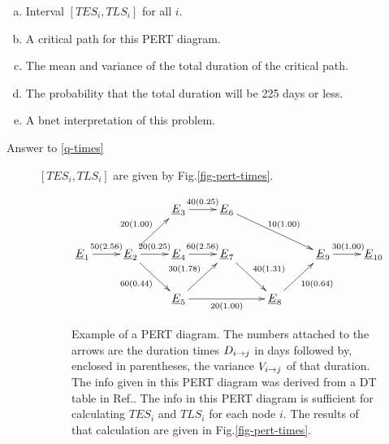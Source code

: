 \begin{enumerate}[(a)]
\item\label{q-times} Interval $[TES_i, TLS_i]$
for all $i$.
\item\label{q-critical}A critical path
for this PERT diagram.
\item\label{q-mean-variance-d} The
mean and variance of the total
duration of the critical path.
\item\label{q-prob} The probability that
the total duration will be 225 days or less.
\item\label{q-pert-bnets} A bnet interpretation
of this problem.
\end{enumerate}
\begin{description}

\item[Answer to \ref{q-times}]
$[TES_i, TLS_i]$
are given by Fig.\ref{fig-pert-times}.

\begin{figure}[h!]
\centering
$$\xymatrix{
&&\rvE_3\ar[r]^{40 (0.25)}
&\rvE_6\ar[drr]^{10 (1.00)}
\\
\rvE_1\ar[r]^{50 (2.56)}
&\rvE_2\ar[ru]^{20 (1.00)}
\ar[rd]_{60 (0.44)}
\ar[r]^{20 (0.25)}
&\rvE_4\ar[r]^{60 (2.56)}
&\rvE_7\ar[rd]^{40 (1.31) }
&&\rvE_9\ar[r]^{30 (1.00)}
&\rvE_{10}
\\
&&\rvE_5\ar[ru]^{30 (1.78)}
\ar[rr]_{20 (1.00)}
&&\rvE_8\ar[ru]_{10 (0.64)}
}$$
\caption{Example of a PERT
diagram. The numbers attached to
the arrows are the duration times
 $D_{i\rightarrow j}$ in days
followed by, enclosed
in parentheses,
the variance $V_{i\rightarrow j}$
of that duration.
The info given
in this PERT diagram
was derived
from a DT table in Ref.\cite{ibook}. The
info in this PERT
diagram 
is sufficient
for calculating
$TES_i$ and $TLS_i$
for each node $i$.
The results of that calculation 
are given in Fig.\ref{fig-pert-times}.
}
\label{fig-pert-diag}
\end{figure}




\end{description}
